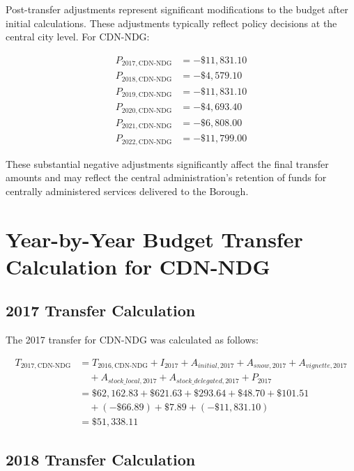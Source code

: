 \documentclass{article}
\begin{document}
Post-transfer adjustments represent significant modifications to the budget after initial calculations. These adjustments typically reflect policy decisions at the central city level. For CDN-NDG:

\begin{equation}
\begin{aligned}
P_{2017,\text{CDN-NDG}} &= -\$11,831.10 \\
P_{2018,\text{CDN-NDG}} &= -\$4,579.10 \\
P_{2019,\text{CDN-NDG}} &= -\$11,831.10 \\
P_{2020,\text{CDN-NDG}} &= -\$4,693.40 \\
P_{2021,\text{CDN-NDG}} &= -\$6,808.00 \\
P_{2022,\text{CDN-NDG}} &= -\$11,799.00
\end{aligned}
\end{equation}

These substantial negative adjustments significantly affect the final transfer amounts and may reflect the central administration's retention of funds for centrally administered services delivered to the Borough.

\section{Year-by-Year Budget Transfer Calculation for CDN-NDG}

\subsection{2017 Transfer Calculation}

The 2017 transfer for CDN-NDG was calculated as follows:

\begin{equation}
\begin{aligned}
T_{2017,\text{CDN-NDG}} &= T_{2016,\text{CDN-NDG}} + I_{2017} + A_{initial,2017} + A_{snow,2017} + A_{vignette,2017} \\
&\quad + A_{stock\_local,2017} + A_{stock\_delegated,2017} + P_{2017} \\
&= \$62,162.83 + \$621.63 + \$293.64 + \$48.70 + \$101.51 \\
&\quad + (-\$66.89) + \$7.89 + (-\$11,831.10) \\
&= \$51,338.11
\end{aligned}
\end{equation}

\subsection{2018 Transfer Calculation}
\end{document}
